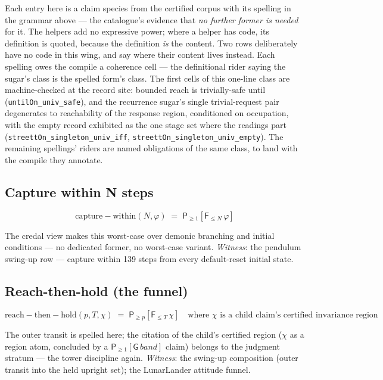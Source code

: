 Each entry here is a claim species from the certified corpus with its
spelling in the grammar above --- the catalogue's evidence that
\emph{no further former is needed} for it. The helpers add no
expressive power; where a helper has code, its definition is quoted,
because the definition \emph{is} the content. Two rows deliberately
have no code in this wing, and say where their content lives instead.
Each spelling owes the compile a coherence cell --- the definitional
rider saying the sugar's class is the spelled form's class. The
first cells of this one-line class are machine-checked at the record
site: bounded reach is trivially-safe until
(\texttt{untilOn\_univ\_safe}), and the recurrence sugar's single
trivial-request pair degenerates to reachability of the response
region, conditioned on occupation, with the empty record exhibited
as the one stage set where the readings part
(\texttt{streettOn\_singleton\_univ\_iff},
\texttt{streettOn\_singleton\_univ\_empty}). The remaining
spellings' riders are named obligations of the same class, to land
with the compile they annotate.

\subsection{Capture within N steps}
\label{sec:spec-lang-dcapture}

\[
\mathrm{capture{-}within}(N, \varphi) \;=\;
\mathsf{P}_{\ge 1}[\mathsf{F}_{\le N}\,\varphi]
\]

The credal view makes this worst-case over demonic branching and
initial conditions --- no dedicated former, no worst-case variant.
\emph{Witness}: the pendulum swing-up row --- capture within 139
steps from every default-reset initial state.



\subsection{Reach-then-hold (the funnel)}
\label{sec:spec-lang-dfunnel}

\[
\mathrm{reach{-}then{-}hold}(p, T, \chi) \;=\;
\mathsf{P}_{\ge p}[\mathsf{F}_{\le T}\,\chi]
\quad\text{where } \chi \text{ is a child claim's certified
invariance region}
\]

The outer transit is spelled here; the citation of the child's
certified region ($\chi$ as a region atom, concluded by a
$\mathsf{P}_{\ge 1}[\mathsf{G}\,\mathit{band}]$ claim) belongs to
the judgment stratum --- the tower discipline again. \emph{Witness}: the
swing-up composition (outer transit into the held upright set); the
LunarLander attitude funnel.

